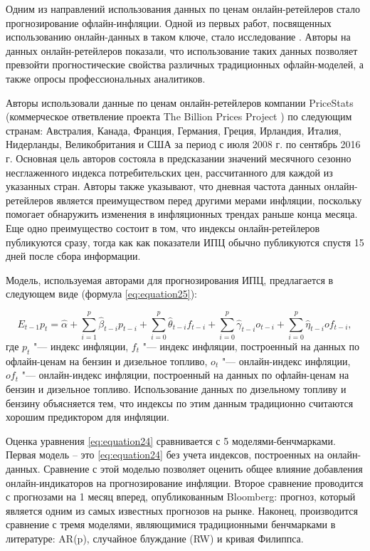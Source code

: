 Одним из направлений использования данных по ценам онлайн-ретейлеров стало прогнозирование офлайн-инфляции. Одной из первых работ, посвященных использованию онлайн-данных в таком ключе, стало исследование \cite{aparicio2020forecasting}. Авторы на данных онлайн-ретейлеров показали, что использование таких данных позволяет превзойти прогностические свойства различных традиционных офлайн-моделей, а также опросы профессиональных аналитиков.

Авторы использовали данные по ценам онлайн-ретейлеров компании PriceStats (коммерческое ответвление проекта The Billion Prices Project \cite{cavallo2016billion}) по следующим странам: Австралия, Канада, Франция, Германия, Греция, Ирландия, Италия, Нидерланды, Великобритания и США за период с июля 2008 г. по сентябрь 2016 г. Основная цель авторов состояла в предсказании значений месячного сезонно несглаженного индекса потребительских цен, рассчитанного для каждой из указанных стран. Авторы также указывают, что дневная частота данных онлайн-ретейлеров является преимуществом перед другими мерами инфляции, поскольку помогает обнаружить изменения в инфляционных трендах раньше конца месяца. Еще одно преимущество состоит в том, что индексы онлайн-ретейлеров публикуются сразу, тогда как как показатели ИПЦ обычно публикуются спустя 15 дней после сбора информации.

Модель, используемая авторами для прогнозирования ИПЦ, предлагается в следующем виде (формула \eqref{eq:equation25}):

\begin{equation}
	\label{eq:equation25}
	E_{t-1}p_t = \hat{\alpha} + \sum_{i=1}^p \hat{\beta}_{t-i} p_{t-i} + \sum_{i=0}^p \hat{\theta}_{t-i} f_{t-i} + \sum_{i=0}^p \hat{\gamma}_{t-i} o_{t-i} + \sum_{i=0}^p \hat{\eta}_{t-i} of_{t-i},
\end{equation}
где \( p_t \) "--- индекс инфляции, \( f_t \) "--- индекс инфляции, построенный на данных по офлайн-ценам на бензин и дизельное топливо, \( o_t \) "--- онлайн-индекс инфляции, \( of_t \) "--- онлайн-индекс инфляции, построенный на данных по офлайн-ценам на бензин и дизельное топливо. Использование данных по дизельному топливу и бензину объясняется тем, что индексы по этим данным традиционно считаются хорошим предиктором для инфляции.

Оценка уравнения \cref{eq:equation24} сравнивается с 5 моделями-бенчмарками. Первая модель – это \cref{eq:equation24} без учета индексов, построенных на онлайн-данных. Сравнение с этой моделью позволяет оценить общее влияние добавления онлайн-индикаторов на прогнозирование инфляции. Второе сравнение проводится с прогнозами на 1 месяц вперед, опубликованным Bloomberg: прогноз, который является одним из самых известных прогнозов на рынке. Наконец, производится сравнение с тремя моделями, являющимися традиционными бенчмарками в литературе: AR(p), случайное блуждание (RW) и кривая Филиппса.

